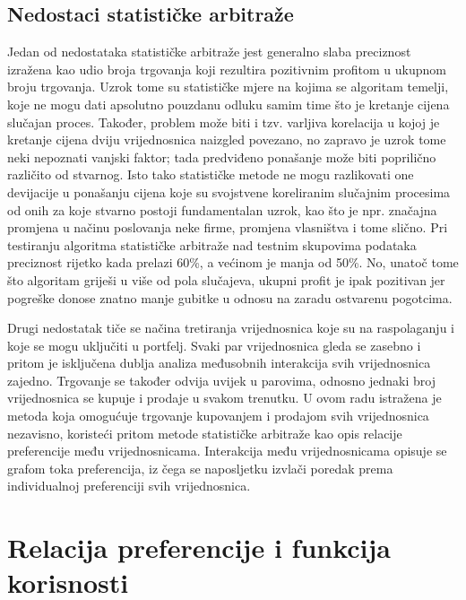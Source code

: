\documentclass[lmodern, utf8, diplomski, numeric]{fer}
\begin{document}
  \subsection{Nedostaci statističke arbitraže}
  Jedan od nedostataka statističke arbitraže jest generalno slaba preciznost izražena kao udio broja trgovanja koji rezultira pozitivnim profitom u ukupnom broju trgovanja.
  Uzrok tome su statističke mjere na kojima se algoritam temelji, koje ne mogu dati apsolutno pouzdanu odluku samim time što je kretanje cijena slučajan proces.
  Također, problem može biti i tzv. varljiva korelacija u kojoj je kretanje cijena dviju vrijednosnica naizgled povezano, no zapravo je uzrok tome neki nepoznati vanjski faktor; tada predviđeno ponašanje može biti poprilično različito od stvarnog.
  Isto tako statističke metode ne mogu razlikovati one devijacije u ponašanju cijena koje su svojstvene koreliranim slučajnim procesima od onih za koje stvarno postoji fundamentalan uzrok, kao što je npr. značajna promjena u načinu poslovanja neke firme, promjena vlasništva i tome slično.
  Pri testiranju algoritma statističke arbitraže nad testnim skupovima podataka preciznost rijetko kada prelazi 60\%, a većinom je manja od 50\%.
  No, unatoč tome što algoritam griješi u više od pola slučajeva, ukupni profit je ipak pozitivan jer pogreške donose znatno manje gubitke u odnosu na zaradu ostvarenu pogotcima.
  
  Drugi nedostatak tiče se načina tretiranja vrijednosnica koje su na raspolaganju i koje se mogu uključiti u portfelj.
  Svaki par vrijednosnica gleda se zasebno i pritom je isključena dublja analiza međusobnih interakcija svih vrijednosnica zajedno.
  Trgovanje se također odvija uvijek u parovima, odnosno jednaki broj vrijednosnica se kupuje i prodaje u svakom trenutku.
  U ovom radu istražena je metoda koja omogućuje trgovanje kupovanjem i prodajom svih vrijednosnica nezavisno, koristeći pritom metode statističke arbitraže kao opis relacije preferencije među vrijednosnicama.
  Interakcija među vrijednosnicama opisuje se grafom toka preferencija, iz čega se naposljetku izvlači poredak prema individualnoj preferenciji svih vrijednosnica.
  
  

  \section{Relacija preferencije i funkcija korisnosti}
\end{document}
